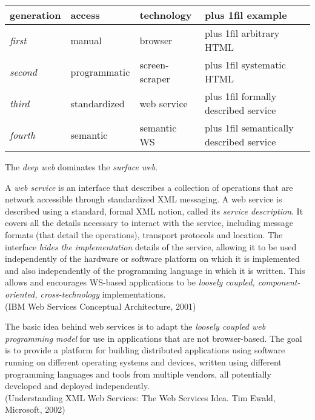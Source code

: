 \documentclass{sepslide-soa-faked} %
\begin{document}
\begin{slide}
\begin{flushleft}
\begin{tabular}{@{}l|l|l|>{\rightskip 0pt plus 1fil}p{1.5in}@{}}
\textbf{generation} & \textbf{access} & \textbf{technology} & \textbf{example} 
  \\ \hline
\textit{first} & manual & browser & arbitrary HTML \\
\textit{second} & programmatic & screen-scraper & systematic HTML \\
\textit{third} & standardized & web service & formally described service \\
\textit{fourth} & semantic & semantic WS & semantically described service
\end{tabular}
\end{flushleft}
The \emph{deep web} dominates the \emph{surface web}. 
\end{slide}

\begin{slide}
\begin{flushleft} 
{\sffamily
	A \emph{web service} is an interface that describes a
	collection of operations that are network accessible through
	standardized XML messaging. A web service is described using a
	standard, formal XML notion, called its \emph{service
	description}. It covers all the details necessary to interact
	with the service, including message formats (that detail the
	operations), transport protocols and location. The interface
	\emph{hides the implementation} details of the service, allowing it
	to be used independently of the hardware or software platform
	on which it is implemented and also independently of the
	programming language in which it is written. This allows and
	encourages WS-based applications to be \emph{loosely
	coupled, component-oriented, cross-technology}
	implementations. 
} \medskip \\
(IBM Web Services Conceptual Architecture, 2001)
\end{flushleft}
\end{slide}

\begin{slide}
\begin{flushleft}
{\sffamily
The basic idea behind web services is to adapt the \emph{loosely coupled web
programming model} for use in applications that are not
browser-based. The goal is to provide a platform for building
distributed applications using software running on different operating
systems and devices, written using different programming languages and
tools from multiple vendors, all potentially developed and deployed
independently.
} \medskip \\
(Understanding XML Web Services: The Web Services Idea. Tim Ewald,
Microsoft, 2002)
\end{flushleft}
\end{slide}
\end{document}
